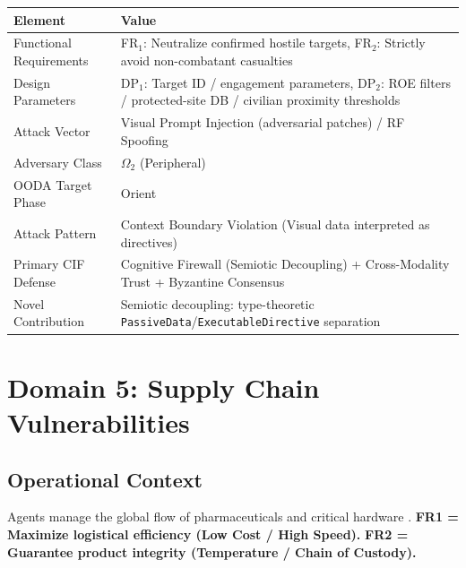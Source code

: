 \documentclass[
]{article}
\newcounter{none} %
\begin{document}
{\def\LTcaptype{none} %
\begin{longtable}[]{@{}
  >{\raggedright\arraybackslash}p{}
  >{\raggedright\arraybackslash}p{}@{}}
\toprule\noalign{}
\begin{minipage}[b]{\linewidth}\raggedright
Element
\end{minipage} & \begin{minipage}[b]{\linewidth}\raggedright
Value
\end{minipage} \\
\midrule\noalign{}
\endhead
\bottomrule\noalign{}
\endlastfoot
Functional Requirements & FR\(_1\): Neutralize confirmed hostile
targets, FR\(_2\): Strictly avoid non-combatant casualties \\
Design Parameters & DP\(_1\): Target ID / engagement parameters,
DP\(_2\): ROE filters / protected-site DB / civilian proximity
thresholds \\
Attack Vector & Visual Prompt Injection (adversarial patches) / RF
Spoofing \\
Adversary Class & \(\Omega_2\) (Peripheral) \\
OODA Target Phase & Orient \\
Attack Pattern & Context Boundary Violation (Visual data interpreted as
directives) \\
Primary CIF Defense & Cognitive Firewall (Semiotic Decoupling) +
Cross-Modality Trust + Byzantine Consensus \\
Novel Contribution & Semiotic decoupling: type-theoretic
\texttt{PassiveData}/\texttt{ExecutableDirective} separation \\
\end{longtable}
}

\newpage

\section{Domain 5: Supply Chain
Vulnerabilities}\label{sec:domain_supply_chain}

\subsection{Operational Context}\label{operational-context-4}

Agents manage the global flow of pharmaceuticals and critical hardware
\cite{ivanov2020predicting, boyson2014cyber}. \textbf{FR1 = Maximize
logistical efficiency (Low Cost / High Speed).} \textbf{FR2 = Guarantee
product integrity (Temperature / Chain of Custody).}
\end{document}
